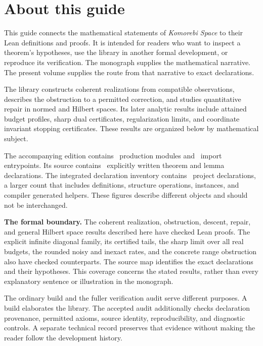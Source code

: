 \documentclass[11pt]{article}
\begin{document}
\KomorebiCover
\section*{About this guide}
This guide connects the mathematical statements of \emph{Komorebi Space} to their Lean definitions and proofs. It is intended for readers who want to inspect a theorem's hypotheses, use the library in another formal development, or reproduce its verification. The monograph supplies the mathematical narrative. The present volume supplies the route from that narrative to exact declarations.

The library constructs coherent realizations from compatible observations, describes the obstruction to a permitted correction, and studies quantitative repair in normed and Hilbert spaces. Its later analytic results include attained budget profiles, sharp dual certificates, regularization limits, and coordinate invariant stopping certificates. These results are organized below by mathematical subject.

The accompanying edition contains \EditionProductionModules\ production modules and \EditionEntrypoints\ import entrypoints. Its source contains \EditionExplicitTheorems\ explicitly written theorem and lemma declarations. The integrated declaration inventory contains \EditionExportedDeclarations\ project declarations, a larger count that includes definitions, structure operations, instances, and compiler generated helpers. These figures describe different objects and should not be interchanged.

\begin{scopebox}
\textbf{The formal boundary.} The coherent realization, obstruction, descent, repair, and general Hilbert space results described here have checked Lean proofs. The explicit infinite diagonal family, its certified tails, the sharp limit over all real budgets, the rounded noisy and inexact rates, and the concrete range obstruction also have checked counterparts. The source map identifies the exact declarations and their hypotheses. This coverage concerns the stated results, rather than every explanatory sentence or illustration in the monograph.
\end{scopebox}

The ordinary build and the fuller verification audit serve different purposes. A build elaborates the library. The accepted audit additionally checks declaration provenance, permitted axioms, source identity, reproducibility, and diagnostic controls. A separate technical record preserves that evidence without making the reader follow the development history.
\end{document}

